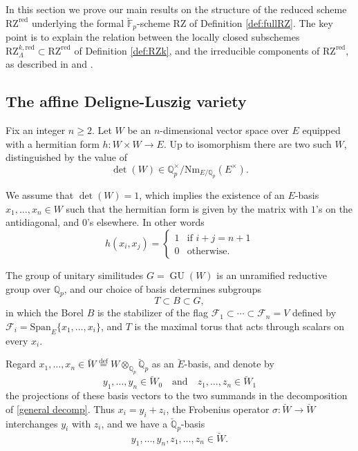 \documentclass[11pt]{alggeom}
\newcommand{\define}{\stackrel{\mathrm{def}}{=}}
\newcommand{\red}{\mathrm{red}}
\newcommand{\Q}{\mathbb Q}
\newcommand{\F}{\mathbb F}
\DeclareMathOperator{\GU}{GU}
\begin{document}




In this section we prove our main results on the structure of the reduced scheme $\mathrm{RZ}^\red$ underlying the formal $\breve{\F}_p$-scheme $\mathrm{RZ}$ of Definition \ref{def:fullRZ}.   
The key point is to explain the relation between the  locally closed subschemes  $ \mathrm{RZ}^{k,\red}_\Lambda \subset \mathrm{RZ}^\red$ of Definition \ref{def:RZk}, and  the irreducible components of $ \mathrm{RZ}^\red$, as described in \cite{XZ} and \cite{FI}.





\subsection{The affine Deligne-Luszig variety}



 Fix an integer $n\ge 2$.
 Let $W$ be an $n$-dimensional vector space over $E$ equipped with a hermitian form 
 $h : W \times W \to E$.  Up to isomorphism there are two such $W$, distinguished  by the value of 
 \[
 \det(W) \in \Q_p^\times /\mathrm{Nm}_{E/\Q_p}(E^\times) .
 \]
 
 We assume that $\det(W)=1$, which implies the existence of an $E$-basis $x_1,\ldots, x_n \in W$ such that the hermitian form is given by the matrix with $1$'s on the antidiagonal, and $0$'s elsewhere.  In other words
 \[
 h(x_i,x_j) = \begin{cases}
 1 & \mbox{if }i+j=n + 1 \\
 0 & \mbox{otherwise.}
 \end{cases}
 \]
 
The group of unitary similitudes $G=\GU(W)$ is an unramified reductive group over $\Q_p$, and our choice of basis determines subgroups
 \[
 T \subset B \subset G, 
 \]
 in which the Borel $B$ is  the stabilizer of the flag  $\mathcal{F}_1\subset \cdots \subset \mathcal{F}_n=V$ defined by $\mathcal{F}_i=\mathrm{Span}_E\{x_1,\ldots, x_i\}$, and  $T$ is the  maximal torus that acts through scalars on every $x_i$.
 
 
 
 
Regard $x_1 ,\ldots, x_n \in \breve{W}\define  W \otimes_{\Q_p} \breve{\Q}_p$ as an $\breve{E}$-basis, and denote by 
\[
y_1,\ldots, y_n \in  \breve{W}_0 \quad \mbox{and}\quad z_1,\ldots, z_n \in  \breve{W}_1
\]
the projections of these basis vectors to the two summands in the decomposition of \eqref{general decomp}.
Thus $x_i =y_i+z_i$, the Frobenius operator
$
\sigma : \breve{W} \to \breve{W}
$
interchanges $y_i$ with $z_i$,  and we have a $\breve{\Q}_p$-basis
\[
y_1,\ldots, y_n,z_1,\ldots, z_n  \in \breve{W} .
\]
\end{document}

